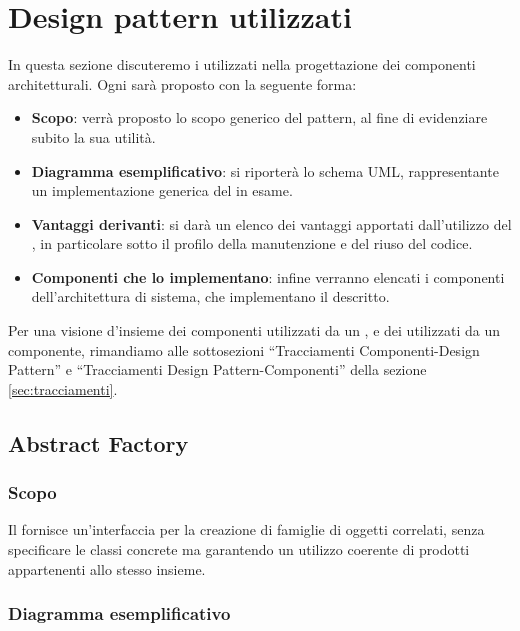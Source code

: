 \section{Design pattern utilizzati}
In questa sezione discuteremo i  utilizzati nella progettazione dei componenti architetturali. Ogni  sarà proposto con la seguente forma:
\begin{itemize}
	\item \textbf{Scopo}: verrà proposto lo scopo generico del pattern, al fine di evidenziare subito la sua utilità.
	\item \textbf{Diagramma esemplificativo}: si riporterà lo schema UML, rappresentante un implementazione generica del  in esame.
	\item \textbf{Vantaggi derivanti}: si darà un elenco dei vantaggi apportati dall'utilizzo del , in particolare sotto il profilo della manutenzione e del riuso del codice.
	\item \textbf{Componenti che lo implementano}: infine verranno elencati i componenti dell'architettura di sistema, che implementano il  descritto.
\end{itemize}

Per una visione d'insieme dei componenti utilizzati da un , e dei  utilizzati da un componente, rimandiamo alle sottosezioni ``Tracciamenti Componenti-Design Pattern'' e ``Tracciamenti Design Pattern-Componenti'' della sezione \vref{sec:tracciamenti}.

\subsection{Abstract Factory}
\subsubsection{Scopo}
Il  fornisce un'interfaccia per la creazione di famiglie di oggetti correlati, senza specificare le classi concrete ma garantendo un utilizzo coerente di prodotti appartenenti allo stesso insieme.

\subsubsection{Diagramma esemplificativo}
